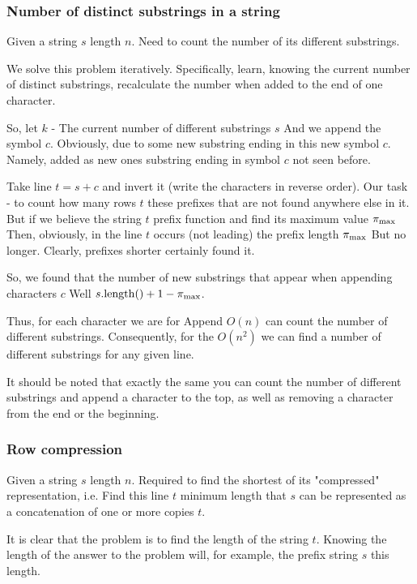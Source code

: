 \subsubsection{ Number of distinct substrings in a string }

Given a string $s$ length $n$. Need to count the number of its different substrings.

We solve this problem iteratively. Specifically, learn, knowing the current number of distinct substrings, recalculate the number when added to the end of one character.

So, let $k$ - The current number of different substrings $s$ And we append the symbol $c$. Obviously, due to some new substring ending in this new symbol $c$. Namely, added as new ones substring ending in symbol $c$ not seen before.

Take line $t = s + c$ and invert it (write the characters in reverse order). Our task - to count how many rows $t$ these prefixes that are not found anywhere else in it. But if we believe the string $t$ prefix function and find its maximum value $\pi_ {\rm max}$ Then, obviously, in the line $t$ occurs (not leading) the prefix length $\pi_ {\rm max}$ But no longer. Clearly, prefixes shorter certainly found it.

So, we found that the number of new substrings that appear when appending characters $c$ Well $s. {\rm length}() + 1 - \pi_ {\rm max}$.

Thus, for each character we are for Append $O (n)$ can count the number of different substrings. Consequently, for the $O (n ^ 2)$ we can find a number of different substrings for any given line.

It should be noted that exactly the same you can count the number of different substrings and append a character to the top, as well as removing a character from the end or the beginning.

\subsubsection{ Row compression }

Given a string $s$ length $n$. Required to find the shortest of its "compressed" representation, i.e. Find this line $t$ minimum length that $s$ can be represented as a concatenation of one or more copies $t$.

It is clear that the problem is to find the length of the string $t$. Knowing the length of the answer to the problem will, for example, the prefix string $s$ this length.


